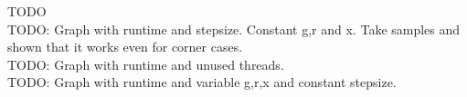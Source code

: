 TODO \\

TODO: Graph with runtime and stepsize. Constant g,r and x. Take samples and shown that it works even for corner cases.\\
TODO: Graph with runtime and unused threads.\\
TODO: Graph with runtime and variable g,r,x and constant stepsize.\\
